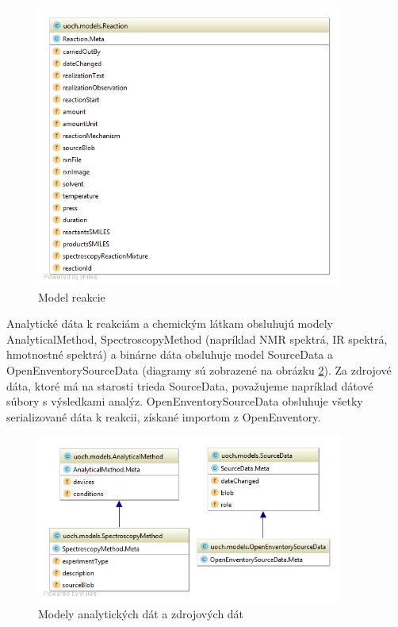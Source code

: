 \documentclass[thesis=M,slovak]{FITthesis}[2013/05/06]
\begin{document}
\begin{figure}\centering
	\includegraphics[width=0.9\textwidth]{diagramy/UOCH_Reaction.png}
 	\caption[Model reakcie]{Model reakcie}\label{graphics:Reaction}
\end{figure}

Analytické dáta k reakciám a chemickým látkam obsluhujú modely AnalyticalMethod, SpectroscopyMethod (napríklad NMR spektrá, IR spektrá, hmotnostné spektrá) a binárne dáta obsluhuje model SourceData a OpenEnventorySourceData (diagramy sú zobrazené na obrázku  \ref{graphics:AnalyticalMethod}). Za zdrojové dáta, ktoré má na starosti trieda SourceData, považujeme napríklad dátové súbory s výsledkami analýz. OpenEnventorySourceData obsluhuje všetky serializované dáta k reakcii, získané importom z OpenEnventory.

\begin{figure}\centering
	\includegraphics[width=0.9\textwidth]{diagramy/UOCH_AnalyticalMethod_and_SourceData.png}
 	\caption[Modely analytických dát a zdrojových dát]{Modely analytických dát a zdrojových dát}\label{graphics:AnalyticalMethod}
\end{figure}
\end{document}
